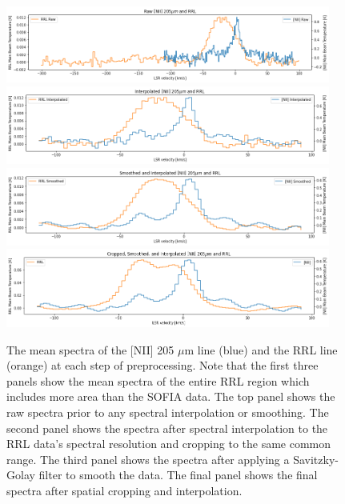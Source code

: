 \begin{figure}[t]
    \centering
    \includegraphics[width=0.95\textwidth]{figs/carina/spec_raw.png}
    \includegraphics[width=0.95\textwidth]{figs/carina/spec_inter.png}
    \includegraphics[width=0.95\textwidth]{figs/carina/spec_smooth.png}    
    \includegraphics[width=0.95\textwidth]{figs/carina/spec_final.png}
    \caption[Mean Spectra of {[}NII{]} 205 $\mu$m and RRL Data During Preprocessing]{
        The mean spectra of the [NII] 205 $\mu$m line (blue) and the RRL line (orange) at each step of preprocessing.
        Note that the first three panels show the mean spectra of the entire RRL region which includes more area than the SOFIA data.
        The top panel shows the raw spectra prior to any spectral interpolation or smoothing.
        The second panel shows the spectra after spectral interpolation to the RRL data's spectral resolution and cropping to the same common range.
        The third panel shows the spectra after applying a Savitzky-Golay filter to smooth the data.
        The final panel shows the final spectra after spatial cropping and interpolation.
        }
    \label{carina/fig:spectral_means}
\end{figure}


